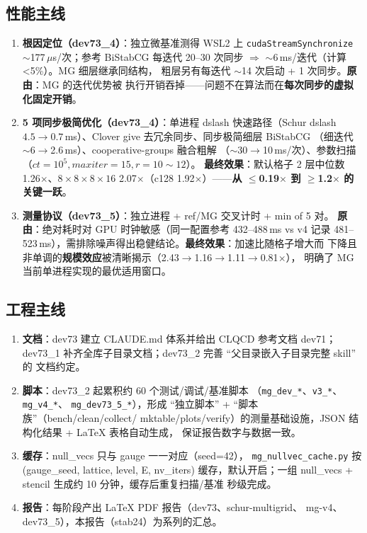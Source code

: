 \documentclass[11pt,a4paper]{article}
\begin{document}
\subsection{性能主线}
\label{sec:ev-perf}

\begin{enumerate}
  \item \textbf{根因定位（dev73\_4）}：独立微基准测得 WSL2 上
        \texttt{cudaStreamSynchronize} $\sim$177\,$\mu$s/次；参考 BiStabCG 每迭代
        20--30 次同步 $\Rightarrow$ $\sim$6\,ms/迭代（计算 <5\%）。MG 细层继承同结构，
        粗层另有每迭代 $\sim$14 次启动 + 1 次同步。\textbf{原由}：MG 的迭代优势被
        执行开销吞掉——问题不在算法而在\textbf{每次同步的虚拟化固定开销}。
  \item \textbf{5 项同步极简优化（dev73\_4）}：单进程 dslash 快速路径（Schur dslash
        $4.5\to0.7$\,ms）、Clover give 去冗余同步、同步极简细层 BiStabCG
        （细迭代 $\sim$6$\to$2.6\,ms）、cooperative-groups 融合粗解
        （$\sim$30$\to$10\,ms/次）、参数扫描（$ct=10^5, maxiter=15, r=10\sim12$）。
        \textbf{最终效果}：默认格子 2 层中位数 1.26$\times$、$8\times8\times8\times16$
        2.07$\times$（c128 1.92$\times$）——\textbf{从 $\le$0.19$\times$ 到 $\ge$1.2$\times$
        的关键一跃}。
  \item \textbf{测量协议（dev73\_5）}：独立进程 + ref/MG 交叉计时 + min of 5 对。
        \textbf{原由}：绝对耗时对 GPU 时钟敏感（同一配置参考 432--488\,ms vs v4 记录
        481--523\,ms），需排除噪声得出稳健结论。\textbf{最终效果}：加速比随格子增大而
        下降且非单调的\textbf{规模效应}被清晰揭示（2.43$\to$1.16$\to$1.11$\to$0.81$\times$），
        明确了 MG 当前单进程实现的最优适用窗口。
\end{enumerate}

\subsection{工程主线}
\label{sec:ev-eng}

\begin{enumerate}
  \item \textbf{文档}：dev73 建立 CLAUDE.md 体系并给出 CLQCD 参考文档 dev71；
        dev73\_1 补齐全库子目录文档；dev73\_2 完善 ``父目录嵌入子目录完整 skill'' 的
        文档约定。
  \item \textbf{脚本}：dev73\_2 起累积约 60 个测试/调试/基准脚本
        （\texttt{mg\_dev\_*}、\texttt{v3\_*}、\texttt{mg\_v4\_*}、
        \texttt{mg\_dev73\_5\_*}），形成 ``独立脚本'' + ``脚本族''（bench/clean/collect/
        mktable/plots/verify）的测量基础设施，JSON 结构化结果 + LaTeX 表格自动生成，
        保证报告数字与数据一致。
  \item \textbf{缓存}：null\_vecs 只与 gauge 一一对应（seed=42），
        \texttt{mg\_nullvec\_cache.py} 按 (gauge\_seed, lattice, level, E, nv\_iters)
        缓存，默认开启；一组 null\_vecs + stencil 生成约 10 分钟，缓存后重复扫描/基准
        秒级完成。
  \item \textbf{报告}：每阶段产出 LaTeX PDF 报告（dev73、schur-multigrid、
        mg-v4、dev73\_5），本报告（stab24）为系列的汇总。
\end{enumerate}
\end{document}
